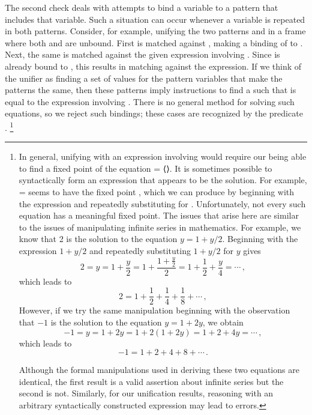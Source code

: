 The second check deals with attempts to bind a variable to a pattern that includes that variable.
Such a situation can occur whenever a variable is repeated in both patterns.
Consider, for example, unifying the two patterns  and  in a frame where both  and  are unbound.
First  is matched against , making a binding of  to .
Next, the same  is matched against the given expression involving .
Since  is already bound to , this results in matching  against the expression.
If we think of the unifier as finding a set of values for the pattern variables that make the patterns the same, then these patterns imply instructions to find a  such that  is equal to the expression involving .
There is no general method for solving such equations, so we reject such bindings;
these cases are recognized by the predicate .%
\footnote{
	In general, unifying  with an expression involving  would require our being able to find a fixed point of the equation  = ⟨⟩.
	It is sometimes possible to syntactically form an expression that appears to be the solution.
	For example,  =  seems to have the fixed point , which we can produce by beginning with the expression  and repeatedly substituting  for .
	Unfortunately, not every such equation has a meaningful fixed point.
	The issues that arise here are similar to the issues of manipulating infinite series in mathematics.
	For example, we know that 2 is the solution to the equation \( y = 1 + y / 2 \).
	Beginning with the expression \( 1 + y / 2 \) and repeatedly substituting \( 1 + y / 2 \) for \( y \) gives
	\[
		2
		= y
		= 1 + \frac{y}{2}
		= 1 + \frac{1 + \frac{y}{2}}{2}
		= 1 + \frac{1}{2} + \frac{y}{4}
		= \dotsb \,,
	\]
	which leads to 
	\[
		2 = 1 + \frac{1}{2} + \frac{1}{4} + \frac{1}{8} + \dotsb \,,
	\]
	However, if we try the same manipulation beginning with the observation that \( -1 \) is the solution to the equation \( y = 1 + 2y \), we obtain
	\[
		-1
		= y
		= 1 + 2 y
		= 1 + 2 (1 + 2y)
		= 1 + 2 + 4 y
		= \dotsb \,,
	\]
	which leads to
	\[
		-1 = 1 + 2 + 4 + 8 + \dotsb \,.
	\]

	Although the formal manipulations used in deriving these two equations are identical, the first result is a valid assertion about infinite series but the second is not.
	Similarly, for our unification results, reasoning with an arbitrary syntactically constructed expression may lead to errors.
}

